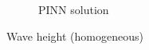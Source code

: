\begin{frame}
\begin{figure}
\begin{subfigure}[b]{0.45\textwidth}
            \caption{PINN solution}
            \label{fig:10_homogeneous_pinn_swe_height}
        \end{subfigure}
        \caption{Wave height (homogeneous)}
        \label{fig:10_homogeneous_wave_height}
    \end{figure}
\end{frame}